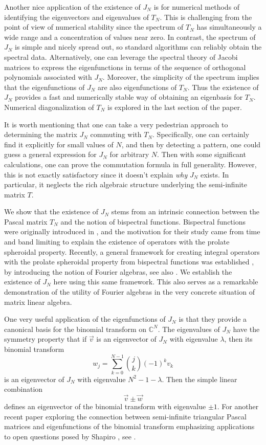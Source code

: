 \documentclass[11pt]{amsart}
\theoremstyle{plain}
\theoremstyle{named}
\begin{document}
Another nice application of the existence of $J_N$ is for numerical methods of identifying the eigenvectors and eigenvalues of $T_N$.
This is challenging from the point of view of numerical stability since the spectrum of $T_N$ has simultaneously a wide range and a concentration of values near zero.
In contrast, the spectrum of $J_N$ is simple and nicely spread out, so standard algorithms can reliably obtain the spectral data.
Alternatively, one can leverage the spectral theory of Jacobi matrices to express the eigenfunctions in terms of the sequence of orthogonal polynomials associated with $J_N$.
Moreover, the simplicity of the spectrum implies that the eigenfunctions of $J_N$ are also eigenfunctions of $T_N$.
Thus the existence of $J_N$ provides a fast and numerically stable way of obtaining an eigenbasis for $T_N$.
Numerical diagonalization of $T_N$ is explored in the last section of the paper.

It is worth mentioning that one can take a very pedestrian approach to determining the matrix $J_N$ commuting with $T_N$.
Specifically, one can certainly find it explicitly for small values of $N$, and then by detecting a pattern, one could guess a general expression for $J_N$ for arbitrary $N$.
Then with some significant calculations, one can prove the commutation formula in full generality. However, this is not exactly satisfactory since it doesn't explain \emph{why} $J_N$ exists.
In particular, it neglects the rich algebraic structure underlying the semi-infinite matrix $T$.

We show that the
existence of $J_N$ stems from an intrinsic connection between the Pascal matrix $T_N$ and the notion of bispectral functions.
Bispectral functions were originally introduced in \cite{DG}, and the motivation for their study came from time and band limiting to explain the existence of operators with the prolate spheroidal property.
Recently, a general framework for creating integral operators with the prolate spheroidal property from bispectral functions was established \cite{CY1,CGYZ1,CGYZ2}, by introducing the notion of Fourier algebras, see also \cite{CGYZ3,CGYZ4}.
We establish the existence of $J_N$ here using this same framework.
This also serves as a remarkable demonstration of the utility of Fourier algebras in the very concrete situation of matrix linear algebra.

One very useful application of the eigenfunctions of $J_N$ is that they provide a canonical basis for the binomial transform on $\mathbb{C}^N$.
The eigenvalues of $J_N$ have the symmetry property that if $\vec v$ is an eigenvector of $J_N$ with eigenvalue $\lambda$, then its binomial transform
$$w_j = \sum_{k=0}^{N-1}\binom{j}{k}(-1)^kv_k$$
is an eigenvector of $J_N$ with eigenvalue $N^2-1-\lambda$.
Then the simple linear combination
$$\vec v \pm \vec w$$
defines an eigenvector of the binomial transform with eigenvalue $\pm 1$.
For another recent paper exploring the connection between semi-infinite triangular Pascal matrices and eigenfunctions of the binomial transform emphasizing applications to open questions posed by Shapiro \cite{shapiro}, see \cite{tsatsomeros}.
\end{document}

